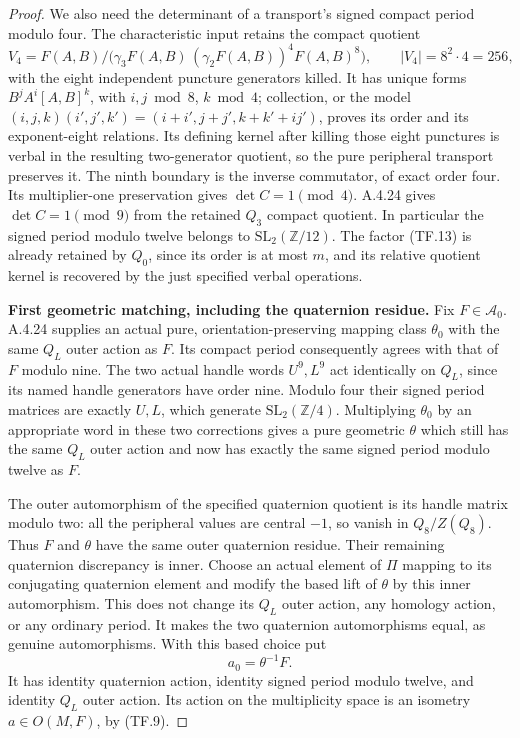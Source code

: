 \begin{proof}
We also need the determinant of a transport's signed
compact period modulo four. The characteristic input
retains the compact quotient
\[
 V_4=F(A,B)/
 \bigl(\gamma_3F(A,B)\,(\gamma_2F(A,B))^4F(A,B)^8\bigr),
                 \qquad |V_4|=8^2\cdot4=256,
 \tag{TF.13}
\]
with the eight independent puncture generators killed.
It has unique forms \(B^jA^i[A,B]^k\), with
\(i,j\bmod8\), \(k\bmod4\); collection, or the model
\((i,j,k)(i',j',k')=(i+i',j+j',k+k'+ij')\), proves
its order and its exponent-eight relations.
Its defining kernel after killing those eight punctures
is verbal in the resulting two-generator quotient,
so the pure peripheral transport preserves it.
The ninth boundary is the inverse commutator, of exact
order four. Its multiplier-one preservation gives
\(\det C=1\pmod4\). A.4.24 gives \(\det C=1\pmod9\)
from the retained \(Q_3\) compact quotient.
In particular the signed period modulo twelve belongs
to \(\mathrm{SL}_2(\mathbb Z/12)\).
The factor (TF.13) is already retained by \(Q_0\), since
its order is at most \(m\), and its relative quotient
kernel is recovered by the just specified verbal operations.

\par\medskip\noindent\textbf{First geometric matching, including the quaternion residue.}\quad
Fix \(F\in\mathcal A_0\). A.4.24 supplies an actual
pure, orientation-preserving mapping class \(\theta_0\)
with the same \(Q_L\) outer action as \(F\).
Its compact period consequently agrees with that of
\(F\) modulo nine. The two actual handle words
\(U^9,L^9\) act identically on \(Q_L\), since its
named handle generators have order nine. Modulo four
their signed period matrices are exactly \(U,L\),
which generate \(\mathrm{SL}_2(\mathbb Z/4)\).
Multiplying \(\theta_0\) by an appropriate word in
these two corrections gives a pure geometric
\(\theta\) which still has the same \(Q_L\) outer
action and now has exactly the same signed period
modulo twelve as \(F\).

The outer automorphism of the specified quaternion
quotient is its handle matrix modulo two: all the
peripheral values are central \(-1\), so vanish in
\(Q_8/Z(Q_8)\). Thus \(F\) and \(\theta\) have
the same outer quaternion residue. Their remaining
quaternion discrepancy is inner. Choose an actual
element of \(\Pi\) mapping to its conjugating quaternion
element and modify the based lift of \(\theta\) by
this inner automorphism. This does not change its
\(Q_L\) outer action, any homology action, or any
ordinary period. It makes the two quaternion
automorphisms equal, as genuine automorphisms.
With this based choice put
\[
                            a_0=\theta^{-1}F.
 \tag{TF.14}
\]
It has identity quaternion action, identity signed
period modulo twelve, and identity \(Q_L\) outer
action. Its action on the multiplicity space is
an isometry \(a\in O(M,F)\), by (TF.9).


\end{proof}
